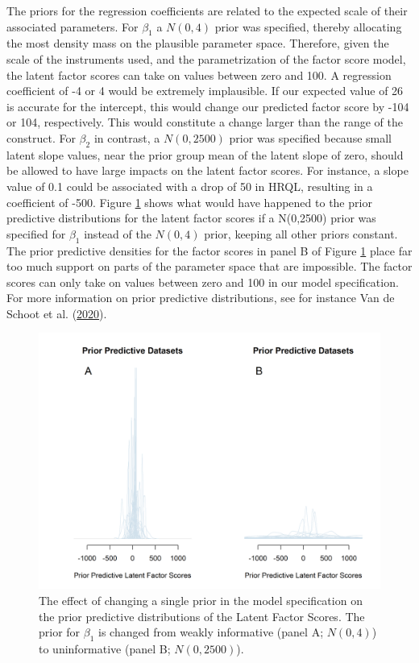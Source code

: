 \documentclass[openright,titlepage,12pt,a4paper]{book}
\begin{document}
The priors for the regression coefficients are related to the expected scale of their associated parameters. For \(\beta_1\) a \(N(0,4)\) prior was specified, thereby allocating the most density mass on the plausible parameter space. Therefore, given the scale of the instruments used, and the parametrization of the factor score model, the latent factor scores can take on values between zero and 100. A regression coefficient of -4 or 4 would be extremely implausible. If our expected value of 26 is accurate for the intercept, this would change our predicted factor score by -104 or 104, respectively. This would constitute a change larger than the range of the construct.
For \(\beta_2\) in contrast, a \(N(0, 2500)\) prior was specified because small latent slope values, near the prior group mean of the latent slope of zero, should be allowed to have large impacts on the latent factor scores. For instance, a slope value of 0.1 could be associated with a drop of 50 in HRQL, resulting in a coefficient of -500. Figure \ref{fig:ch05fig2} shows what would have happened to the prior predictive distributions for the latent factor scores if a N(0,2500) prior was specified for \(\beta_1\) instead of the \(N(0, 4)\) prior, keeping all other priors constant. The prior predictive densities for the factor scores in panel B of Figure \ref{fig:ch05fig2} place far too much support on parts of the parameter space that are impossible. The factor scores can only take on values between zero and 100 in our model specification. For more information on prior predictive distributions, see for instance Van de Schoot et al. (\protect\hyperlink{ref-van_de_schoot_tutorial_2020}{2020}).

\begin{figure}[H]

{\centering \includegraphics[width=0.9\linewidth]{figures/chapter_5/Figure2} 

}

\caption{The effect of changing a single prior in the model specification on the prior predictive distributions of the Latent Factor Scores. The prior for $\beta_1$ is changed from weakly informative (panel A; $N(0,4)$) to uninformative (panel B; $N(0,2500)$). }\label{fig:ch05fig2}
\end{figure}
\end{document}
